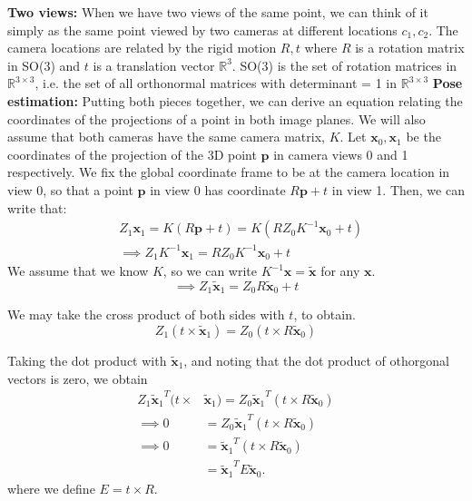 {\textbf{Two views:}
\newline
\newline
When we have two views of the same point, we can think of it simply as the same point viewed by two cameras at different locations $c_1, c_2$.  The camera locations are related by the rigid motion $R, t$ where $R$ is a rotation matrix in SO(3) and $t$ is a translation vector $\mathbb{R}^3$.  SO(3) is the set of rotation matrices in $\mathbb{R}^{3 \times 3}$, i.e. the set of all orthonormal matrices with determinant = 1 in $\mathbb{R}^{3\times 3}$
\newline
\newline
\textbf{Pose estimation:}
\newline
\newline
Putting both pieces together, we can derive an equation relating the coordinates of the projections of a point in both image planes.  We will also assume that both cameras have the same camera matrix, $K$. Let $\mathbf{x}_{0},\mathbf{x}_{1} $ be the coordinates of the projection of the 3D point $\mathbf{p}$ in camera views 0 and 1 respectively. We fix the global coordinate frame to be at the camera location in view 0, so that a point $\mathbf{p}$ in view 0 has coordinate $R\mathbf{p} + t$ in view 1. Then, we can write that: 
\begin{align}
    & Z_{1}\mathbf{x}_1 = K(R\mathbf{p} + t) = K(RZ_{0}K^{-1}\mathbf{x}_{0} + t) \\
    & \implies Z_{1}K^{-1}\mathbf{x}_{1} = RZ_{0}K^{-1}\mathbf{x}_{0} + t 
\end{align}
We assume that we know $K$, so we can write $K^{-1}\mathbf{x} = \tilde{\mathbf{x}}$ for any $\mathbf{x}$.
\begin{equation}
    \implies Z_{1}\tilde{\mathbf{x}}_1 = Z_{0}R\tilde{\mathbf{x}}_0  + t
\end{equation}

We may take the cross product of both sides with $t$, to obtain. 
\begin{equation}
    Z_{1}(t \times \tilde{\mathbf{x}}_1) = Z_{0}(t \times R\tilde{\mathbf{x}}_0 )
\end{equation}

Taking the dot product with $\tilde{\mathbf{x}}_{1}$,  and noting that the dot product of othorgonal vectors is zero, we obtain 
\begin{align}
Z_{1}{\tilde{\mathbf{x}}_{1}}^T(t \times &\tilde{\mathbf{x}}_1) = Z_{0}{\tilde{\mathbf{x}}_{1}}^T(t \times R\tilde{\mathbf{x}}_0 )\\
\implies 0 &= Z_{0}{\tilde{\mathbf{x}}_{1}}^T(t \times R\tilde{\mathbf{x}}_0 )\\
\implies 0 &= {\tilde{\mathbf{x}}_{1}}^T(t \times R\tilde{\mathbf{x}}_0 )\\
&= {\tilde{\mathbf{x}}_{1}}^T E\tilde{\mathbf{x}}_0. \label{eq:Epipolar_Constraint}
\end{align}
where we define $E=t\times R$.
}
